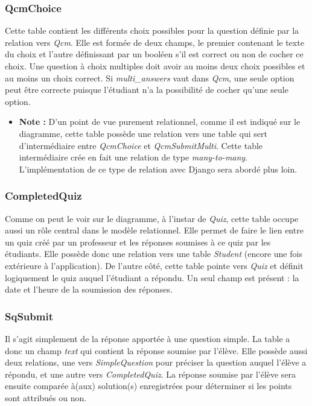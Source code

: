 \documentclass[letterpaper,10pt,french]{sphinxmanual}
\begin{document}
\subsubsection{QcmChoice}
\label{database:qcmchoice}
Cette table contient les différents choix possibles pour la question définie par la relation vers \emph{Qcm}. Elle est formée de deux champs, le premier contenant le texte du choix et l'autre définissant par un booléen s'il est correct ou non de cocher ce choix. Une question à choix multiples doit avoir au moins deux choix possibles et au moins un choix correct. Si \emph{multi\_answers} vaut  dans \emph{Qcm}, une seule option peut être correcte puisque l'étudiant n'a la possibilité de cocher qu'une seule option.
\begin{itemize}
\item {} 
\textbf{Note :} D'un point de vue purement relationnel, comme il est indiqué sur le diagramme, cette table possède une relation vers une table qui sert d'intermédiaire entre \emph{QcmChoice} et \emph{QcmSubmitMulti}. Cette table intermédiaire crée en fait une relation de type \emph{many-to-many}. L'implémentation de ce type de relation avec Django sera abordé plus loin.

\end{itemize}


\subsubsection{CompletedQuiz}
\label{database:completedquiz}
Comme on peut le voir sur le diagramme, à l'instar de \emph{Quiz}, cette table occupe aussi un rôle central dans le modèle relationnel. Elle permet de faire le lien entre un quiz créé par un professeur et les réponses soumises à ce quiz par les étudiants. Elle possède donc une relation vers une table \emph{Student} (encore une fois extérieure à l'application). De l'autre côté, cette table pointe vers \emph{Quiz} et définit logiquement le quiz auquel l'étudiant a répondu. Un seul champ est présent : la date et l'heure de la soumission des réponses.


\subsubsection{SqSubmit}
\label{database:sqsubmit}
Il s'agit simplement de la réponse apportée à une question simple. La table a donc un champ \emph{text} qui contient la réponse soumise par l'élève. Elle possède aussi deux relations, une vers \emph{SimpleQuestion} pour préciser la question auquel l'élève a répondu, et une autre vers \emph{CompletedQuiz}. La réponse soumise par l'élève sera ensuite comparée à(aux) solution(s) enregistrées pour déterminer si les points sont attribués ou non.
\end{document}
